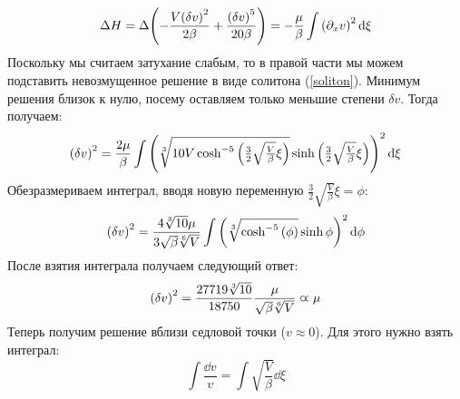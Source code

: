 \documentclass[titlepage]{article}
\begin{document}
\begin{enumerate}
\begin{equation}
 \Delta H =  \Delta \qty(- \frac{V \qty(\delta v)^2}{2\beta} + \frac{\qty(\delta v) ^5}{20\beta}) =  - \dfrac{\mu}{\beta} \int \qty(\partial_x v)^2 \dd{\xi}
\end{equation}
Поскольку мы считаем затухание слабым, то в правой части мы можем подставить невозмущенное решение в виде солитона (\ref{soliton}). Минимум решения близок к нулю, посему оставляем только меньшие степени $\delta v$. Тогда получаем:
\begin{equation}
 \qty(\delta v)^2 =  \dfrac{2\mu}{\beta} \int \qty(\sqrt[3]{10V\cosh^{-5}{\qty(\tfrac32\sqrt{\tfrac{V}{\beta}}\xi)}}\sinh{\qty(\tfrac32\sqrt{\tfrac{V}{\beta}}\xi)} )^2 \dd{\xi}
\end{equation}
Обезразмериваем интеграл, вводя новую переменную $\tfrac32\sqrt{\tfrac{V}{\beta}}\xi = \phi$:
\begin{equation}
 \qty(\delta v)^2 =  \dfrac{4\sqrt[3]{10}\mu}{3\sqrt{\beta }\sqrt[6]{V}}  \int \qty(\sqrt[3]{\cosh^{-5}{\qty(\phi)}}\sinh{\phi} )^2 \dd{\phi}
\end{equation}
После взятия интеграла получаем следующий ответ:
\begin{equation}
 \qty(\delta v)^2 = \dfrac{27 719 \sqrt[3]{10}}{18 750} \dfrac{\mu}{\sqrt{\beta }\sqrt[6]{V}}   \varpropto \mu
\end{equation}
Теперь получим решение вблизи седловой точки ($v \approx 0$). Для этого нужно взять интеграл:
\begin{equation}
 \int \dfrac{\dd{v}}{v} = \int \sqrt{\frac{V}{\beta}} \dd{\xi}
\end{equation}

\end{enumerate}
\end{document}
